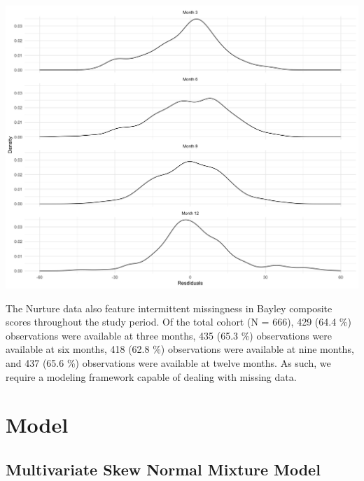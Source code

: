 \documentclass[useAMS,referee]{biom}
\let\origfigure\figure
\let\endorigfigure\endfigure
\renewenvironment{figure}[1][2] {
    \expandafter\origfigure\expandafter[H]
} {
    \endorigfigure
}
\begin{document}
\begin{figure}[h]
	\includegraphics[width = 1\textwidth]{bayley_resids_plot_bytime.jpg}
\end{figure}

The Nurture data also feature intermittent missingness in Bayley composite scores throughout the study period. Of the total cohort (N = 666), 429 (64.4 \%) observations were available at three months, 435 (65.3 \%) observations were available at six months, 418 (62.8 \%) observations were available at nine months, and 437 (65.6 \%) observations were available at twelve months. As such, we require a modeling framework capable of dealing with missing data. 


\section{Model}
\label{s:model}

\subsection{Multivariate Skew Normal Mixture Model}
\end{document}
